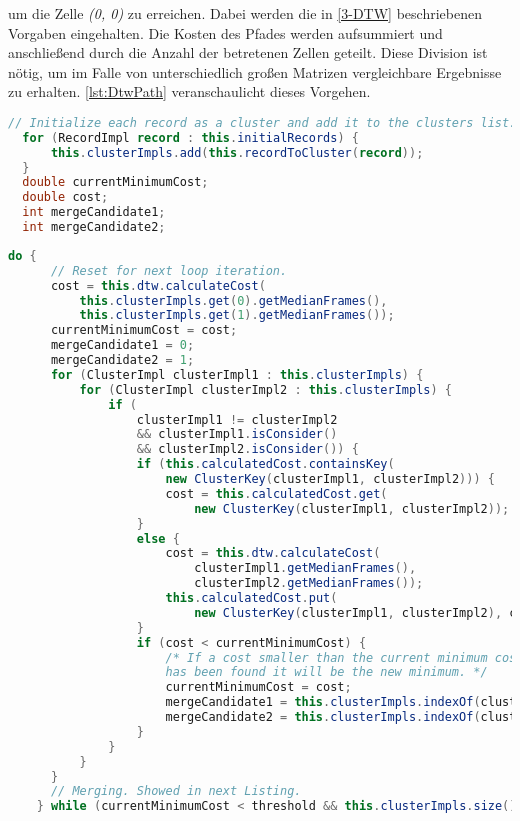 um die Zelle \emph{(0, 0)} zu erreichen.
Dabei werden die in \autoref{3-DTW} beschriebenen Vorgaben eingehalten.
Die Kosten des Pfades werden aufsummiert und anschließend durch die Anzahl der betretenen Zellen geteilt.
Diese Division ist nötig, um im Falle von unterschiedlich großen Matrizen vergleichbare Ergebnisse zu erhalten.
\autoref{lst:DtwPath} veranschaulicht dieses Vorgehen.
\begin{lstfloat}
\begin{lstlisting}[language=Java, label={lst:ClustInit}, caption=Cluster-Methode: Initialisierung.]
  // Initialize each record as a cluster and add it to the clusters list.
  for (RecordImpl record : this.initialRecords) {
      this.clusterImpls.add(this.recordToCluster(record));
  }
  double currentMinimumCost;
  double cost;
  int mergeCandidate1;
  int mergeCandidate2;
\end{lstlisting}
\end{lstfloat}
\begin{lstfloat}
    \begin{lstlisting}[language=Java, label={lst:ClustCalc}, caption=Cluster-Methode: Berechnungsvorgang.]
    do {
      // Reset for next loop iteration.
      cost = this.dtw.calculateCost(    
          this.clusterImpls.get(0).getMedianFrames(),
          this.clusterImpls.get(1).getMedianFrames());
      currentMinimumCost = cost;
      mergeCandidate1 = 0;
      mergeCandidate2 = 1;
      for (ClusterImpl clusterImpl1 : this.clusterImpls) {
          for (ClusterImpl clusterImpl2 : this.clusterImpls) {
              if (
                  clusterImpl1 != clusterImpl2
                  && clusterImpl1.isConsider()
                  && clusterImpl2.isConsider()) {
                  if (this.calculatedCost.containsKey(
                      new ClusterKey(clusterImpl1, clusterImpl2))) {
                      cost = this.calculatedCost.get(
                          new ClusterKey(clusterImpl1, clusterImpl2));
                  }
                  else {
                      cost = this.dtw.calculateCost(
                          clusterImpl1.getMedianFrames(),
                          clusterImpl2.getMedianFrames());
                      this.calculatedCost.put(
                          new ClusterKey(clusterImpl1, clusterImpl2), cost);
                  }
                  if (cost < currentMinimumCost) {
                      /* If a cost smaller than the current minimum cost
                      has been found it will be the new minimum. */
                      currentMinimumCost = cost;
                      mergeCandidate1 = this.clusterImpls.indexOf(clusterImpl1);
                      mergeCandidate2 = this.clusterImpls.indexOf(clusterImpl2);
                  }
              }
          }
      }
      // Merging. Showed in next Listing.
    } while (currentMinimumCost < threshold && this.clusterImpls.size() > 1);
\end{lstlisting}
\end{lstfloat}
